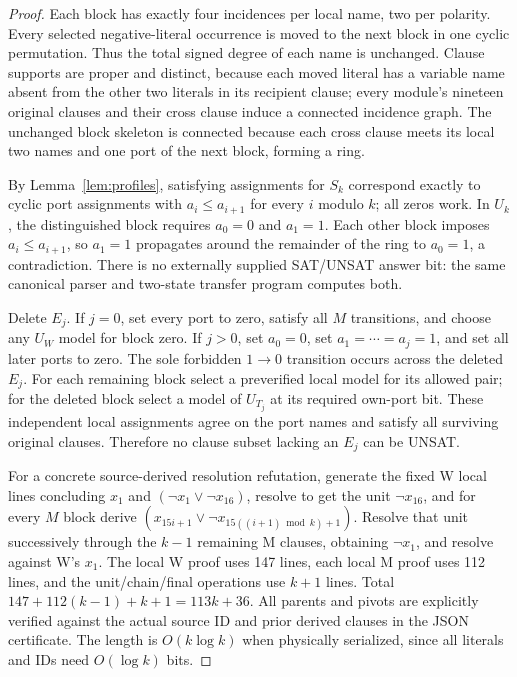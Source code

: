 \documentclass[10pt]{article}
\begin{document}
\begin{proof}
Each block has exactly four incidences per local name, two per polarity. Every selected negative-literal occurrence is moved to the next block in one cyclic permutation. Thus the total signed degree of each name is unchanged. Clause supports are proper and distinct, because each moved literal has a variable name absent from the other two literals in its recipient clause; every module's nineteen original clauses and their cross clause induce a connected incidence graph. The unchanged block skeleton is connected because each cross clause meets its local two names and one port of the next block, forming a ring.

By Lemma~\ref{lem:profiles}, satisfying assignments for $S_k$ correspond exactly to cyclic port assignments with $a_i\le a_{i+1}$ for every $i$ modulo $k$; all zeros work. In $U_k$, the distinguished block requires $a_0=0$ and $a_1=1$. Each other block imposes $a_i\le a_{i+1}$, so $a_1=1$ propagates around the remainder of the ring to $a_0=1$, a contradiction. There is no externally supplied SAT/UNSAT answer bit: the same canonical parser and two-state transfer program computes both.

Delete $E_j$. If $j=0$, set every port to zero, satisfy all $M$ transitions, and choose any $U_W$ model for block zero. If $j>0$, set $a_0=0$, set $a_1=\cdots=a_j=1$, and set all later ports to zero. The sole forbidden $1\to0$ transition occurs across the deleted $E_j$. For each remaining block select a preverified local model for its allowed pair; for the deleted block select a model of $U_{T_j}$ at its required own-port bit. These independent local assignments agree on the port names and satisfy all surviving original clauses. Therefore no clause subset lacking an $E_j$ can be UNSAT.

For a concrete source-derived resolution refutation, generate the fixed W local lines concluding $x_1$ and $(\neg x_1\lor\neg x_{16})$, resolve to get the unit $\neg x_{16}$, and for every $M$ block derive $(x_{15i+1}\lor\neg x_{15((i+1)\bmod k)+1})$. Resolve that unit successively through the $k-1$ remaining M clauses, obtaining $\neg x_1$, and resolve against W's $x_1$. The local W proof uses 147 lines, each local M proof uses 112 lines, and the unit/chain/final operations use $k+1$ lines. Total $147+112(k-1)+k+1=113k+36$. All parents and pivots are explicitly verified against the actual source ID and prior derived clauses in the JSON certificate. The length is $O(k\log k)$ when physically serialized, since all literals and IDs need $O(\log k)$ bits.
\end{proof}
\end{document}
